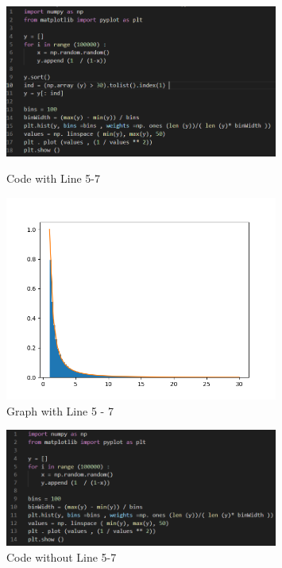 \documentclass[answers]{exam}
\begin{document}
\begin{framed}
\newpage
\begin{figure}[H] %
    \centering
    \includegraphics[width= 0.8\textwidth]{Q2.2_withLine5-7_code.PNG}
    \caption{Code with Line 5-7}
    
    \vspace{1cm} %
    
    \includegraphics[width= 0.8\textwidth]{Q2.2_withLine5-7.PNG}
    \caption{Graph with Line 5 - 7 }
\end{figure}
\newpage
\begin{figure}[H] %
    \centering
    \includegraphics[width= 0.8\textwidth]{Q2.2_withoutLine5-7_code.PNG}
    \caption{Code without Line 5-7 }
    
    \vspace{1cm} %
    

\end{figure}
\end{framed}
\end{document}
